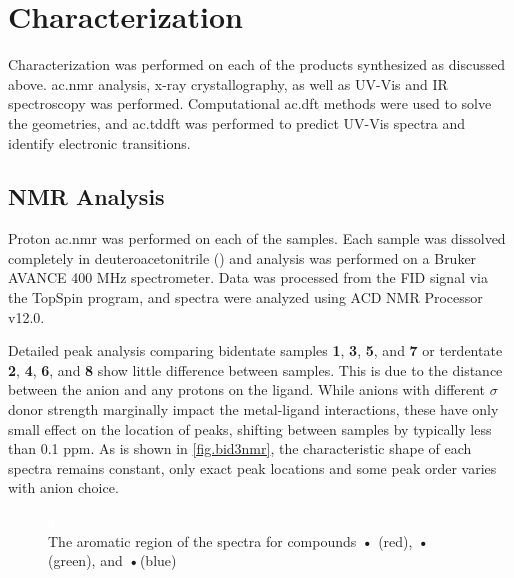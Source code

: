 
\section{Characterization}

Characterization was performed on each of the products synthesized as discussed above. \Gls{ac.nmr} analysis, x-ray crystallography, as well as UV-Vis and IR spectroscopy was performed. Computational \gls{ac.dft} methods were used to solve the geometries, and \gls{ac.tddft} was performed to predict UV-Vis spectra and identify electronic transitions. 

\subsection{NMR Analysis}

Proton \gls{ac.nmr} was performed on each of the samples. Each sample was dissolved completely in deuteroacetonitrile () and analysis was performed on a Bruker AVANCE 400 MHz spectrometer. Data was processed from the FID signal via the TopSpin program, and spectra were analyzed using ACD NMR Processor v12.0. 

Detailed peak analysis comparing bidentate samples \textbf{1}, \textbf{3}, \textbf{5}, and \textbf{7} or terdentate \textbf{2}, \textbf{4}, \textbf{6}, and \textbf{8} show little difference between samples. This is due to the distance between the anion and any protons on the ligand. While anions with different $\sigma$ donor strength marginally impact the metal-ligand interactions, these have only small effect on the location of peaks, shifting between samples by typically less than 0.1 ppm. As is shown in \autoref{fig.bid3nmr}, the characteristic shape of each spectra remains constant, only exact peak locations and some peak order varies with anion choice. 

\begin{figure}[!htbp]
 \begin{center}
  \includegraphics[clip=true]{images/insertgraphic.eps}
 \end{center}
\caption[The aromatic region of the \texorpdfstring{}{1H} spectra of 3 bidentate compounds]{The aromatic region of the \texorpdfstring{}{1H} spectra for compounds \textbf{•} (red), \textbf{•} (green), and \textbf{•}(blue)}
\label{fig.bid3nmr}
\end{figure} 

